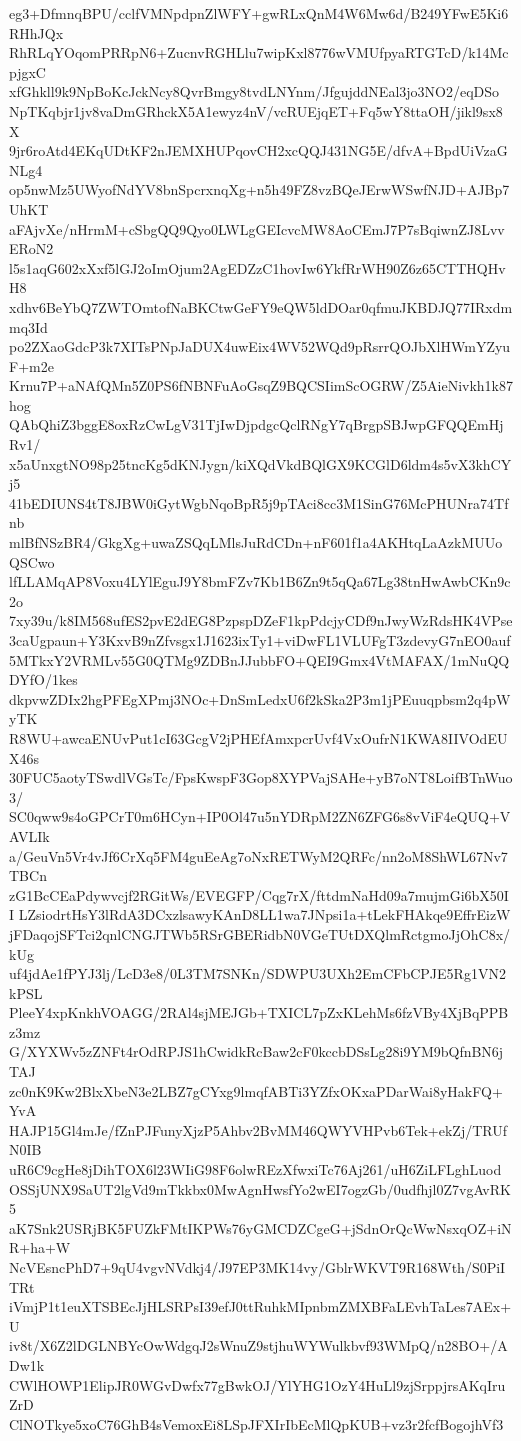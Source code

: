 eg3+DfmnqBPU/cclfVMNpdpnZlWFY+gwRLxQnM4W6Mw6d/B249YFwE5Ki6RHhJQx
RhRLqYOqomPRRpN6+ZucnvRGHLlu7wipKxl8776wVMUfpyaRTGTcD/k14McpjgxC
xfGhkll9k9NpBoKcJckNcy8QvrBmgy8tvdLNYnm/JfgujddNEal3jo3NO2/eqDSo
NpTKqbjr1jv8vaDmGRhckX5A1ewyz4nV/vcRUEjqET+Fq5wY8ttaOH/jikl9sx8X
9jr6roAtd4EKqUDtKF2nJEMXHUPqovCH2xcQQJ431NG5E/dfvA+BpdUiVzaGNLg4
op5nwMz5UWyofNdYV8bnSpcrxnqXg+n5h49FZ8vzBQeJErwWSwfNJD+AJBp7UhKT
aFAjvXe/nHrmM+cSbgQQ9Qyo0LWLgGEIcvcMW8AoCEmJ7P7sBqiwnZJ8LvvERoN2
l5s1aqG602xXxf5lGJ2oImOjum2AgEDZzC1hovIw6YkfRrWH90Z6z65CTTHQHvH8
xdhv6BeYbQ7ZWTOmtofNaBKCtwGeFY9eQW5ldDOar0qfmuJKBDJQ77IRxdmmq3Id
po2ZXaoGdcP3k7XITsPNpJaDUX4uwEix4WV52WQd9pRsrrQOJbXlHWmYZyuF+m2e
Krnu7P+aNAfQMn5Z0PS6fNBNFuAoGsqZ9BQCSIimScOGRW/Z5AieNivkh1k87hog
QAbQhiZ3bggE8oxRzCwLgV31TjIwDjpdgcQclRNgY7qBrgpSBJwpGFQQEmHjRv1/
x5aUnxgtNO98p25tncKg5dKNJygn/kiXQdVkdBQlGX9KCGlD6ldm4s5vX3khCYj5
41bEDIUNS4tT8JBW0iGytWgbNqoBpR5j9pTAci8cc3M1SinG76McPHUNra74Tfnb
mlBfNSzBR4/GkgXg+uwaZSQqLMlsJuRdCDn+nF601f1a4AKHtqLaAzkMUUoQSCwo
lfLLAMqAP8Voxu4LYlEguJ9Y8bmFZv7Kb1B6Zn9t5qQa67Lg38tnHwAwbCKn9c2o
7xy39u/k8IM568ufES2pvE2dEG8PzpspDZeF1kpPdcjyCDf9nJwyWzRdsHK4VPse
3caUgpaun+Y3KxvB9nZfvsgx1J1623ixTy1+viDwFL1VLUFgT3zdevyG7nEO0auf
5MTkxY2VRMLv55G0QTMg9ZDBnJJubbFO+QEI9Gmx4VtMAFAX/1mNuQQDYfO/1kes
dkpvwZDIx2hgPFEgXPmj3NOc+DnSmLedxU6f2kSka2P3m1jPEuuqpbsm2q4pWyTK
R8WU+awcaENUvPut1cI63GcgV2jPHEfAmxpcrUvf4VxOufrN1KWA8IIVOdEUX46s
30FUC5aotyTSwdlVGsTc/FpsKwspF3Gop8XYPVajSAHe+yB7oNT8LoifBTnWuo3/
SC0qww9s4oGPCrT0m6HCyn+IP0Ol47u5nYDRpM2ZN6ZFG6s8vViF4eQUQ+VAVLIk
a/GeuVn5Vr4vJf6CrXq5FM4guEeAg7oNxRETWyM2QRFc/nn2oM8ShWL67Nv7TBCn
zG1BcCEaPdywvcjf2RGitWs/EVEGFP/Cqg7rX/fttdmNaHd09a7mujmGi6bX50II
LZsiodrtHsY3lRdA3DCxzlsawyKAnD8LL1wa7JNpsi1a+tLekFHAkqe9EffrEizW
jFDaqojSFTci2qnlCNGJTWb5RSrGBERidbN0VGeTUtDXQlmRctgmoJjOhC8x/kUg
uf4jdAe1fPYJ3lj/LcD3e8/0L3TM7SNKn/SDWPU3UXh2EmCFbCPJE5Rg1VN2kPSL
PleeY4xpKnkhVOAGG/2RAl4sjMEJGb+TXICL7pZxKLehMs6fzVBy4XjBqPPBz3mz
G/XYXWv5zZNFt4rOdRPJS1hCwidkRcBaw2cF0kccbDSsLg28i9YM9bQfnBN6jTAJ
zc0nK9Kw2BlxXbeN3e2LBZ7gCYxg9lmqfABTi3YZfxOKxaPDarWai8yHakFQ+YvA
HAJP15Gl4mJe/fZnPJFunyXjzP5Ahbv2BvMM46QWYVHPvb6Tek+ekZj/TRUfN0IB
uR6C9cgHe8jDihTOX6l23WIiG98F6olwREzXfwxiTc76Aj261/uH6ZiLFLghLuod
OSSjUNX9SaUT2lgVd9mTkkbx0MwAgnHwsfYo2wEI7ogzGb/0udfhjl0Z7vgAvRK5
aK7Snk2USRjBK5FUZkFMtIKPWs76yGMCDZCgeG+jSdnOrQcWwNsxqOZ+iNR+ha+W
NcVEsncPhD7+9qU4vgvNVdkj4/J97EP3MK14vy/GblrWKVT9R168Wth/S0PiITRt
iVmjP1t1euXTSBEcJjHLSRPsI39efJ0ttRuhkMIpnbmZMXBFaLEvhTaLes7AEx+U
iv8t/X6Z2lDGLNBYcOwWdgqJ2sWnuZ9stjhuWYWulkbvf93WMpQ/n28BO+/ADw1k
CWlHOWP1ElipJR0WGvDwfx77gBwkOJ/YlYHG1OzY4HuLl9zjSrppjrsAKqIruZrD
ClNOTkye5xoC76GhB4sVemoxEi8LSpJFXIrIbEcMlQpKUB+vz3r2fcfBogojhVf3
